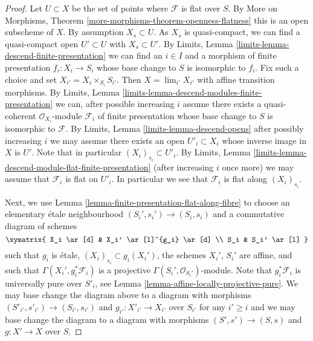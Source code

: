 \begin{proof}
Let $U \subset X$ be the set of points where $\mathcal{F}$ is
flat over $S$. By
More on Morphisms, Theorem \ref{more-morphisms-theorem-openness-flatness}
this is an open subscheme of $X$. By assumption $X_s \subset U$.
As $X_s$ is quasi-compact, we can find a quasi-compact open
$U' \subset U$ with $X_s \subset U'$. By
Limits, Lemma \ref{limits-lemma-descend-finite-presentation}
we can find an $i \in I$ and a morphism of finite presentation
$f_i : X_i \to S_i$ whose base change to $S$ is isomorphic to $f_i$.
Fix such a choice and set $X_{i'} = X_i \times_{S_i} S_{i'}$.
Then $X = \lim_{i'} X_{i'}$ with affine transition morphisms. By
Limits, Lemma \ref{limits-lemma-descend-modules-finite-presentation}
we can, after possible increasing $i$ assume there exists a
quasi-coherent $\mathcal{O}_{X_i}$-module $\mathcal{F}_i$
of finite presentation whose base change to $S$ is isomorphic to
$\mathcal{F}$. By
Limits, Lemma \ref{limits-lemma-descend-opens}
after possibly increasing $i$ we may assume there exists an
open $U'_i \subset X_i$ whose inverse image in $X$ is $U'$.
Note that in particular $(X_i)_{s_i} \subset U'_i$. By
Limits, Lemma \ref{limits-lemma-descend-module-flat-finite-presentation}
(after increasing $i$ once more)
we may assume that $\mathcal{F}_i$ is flat on $U'_i$.
In particular we see that $\mathcal{F}_i$ is flat along $(X_i)_{s_i}$.

\medskip\noindent
Next, we use
Lemma \ref{lemma-finite-presentation-flat-along-fibre}
to choose an elementary \'etale neighbourhood
$(S_i', s_i') \to (S_i, s_i)$ and a commutative diagram of schemes
$$
\xymatrix{
X_i \ar[d] & X_i' \ar[l]^{g_i} \ar[d] \\
S_i & S_i' \ar[l]
}
$$
such that $g_i$ is \'etale, $(X_i)_{s_i} \subset g_i(X_i')$, the schemes
$X_i'$, $S_i'$ are affine, and such that
$\Gamma(X_i', g_i^*\mathcal{F}_i)$ is a projective
$\Gamma(S_i', \mathcal{O}_{S_i'})$-module.
Note that $g_i^*\mathcal{F}_i$ is universally pure over $S'_i$, see
Lemma \ref{lemma-affine-locally-projective-pure}.
We may base change the diagram above to a diagram with morphisms
$(S'_{i'}, s'_{i'}) \to (S_{i'}, s_{i'})$ and
$g_{i'} : X'_{i'} \to X_{i'}$ over $S_{i'}$
for any $i' \geq i$ and we may base change the diagram to a diagram
with morphisms $(S', s') \to (S, s)$ and $g : X' \to X$ over $S$.


\end{proof}
